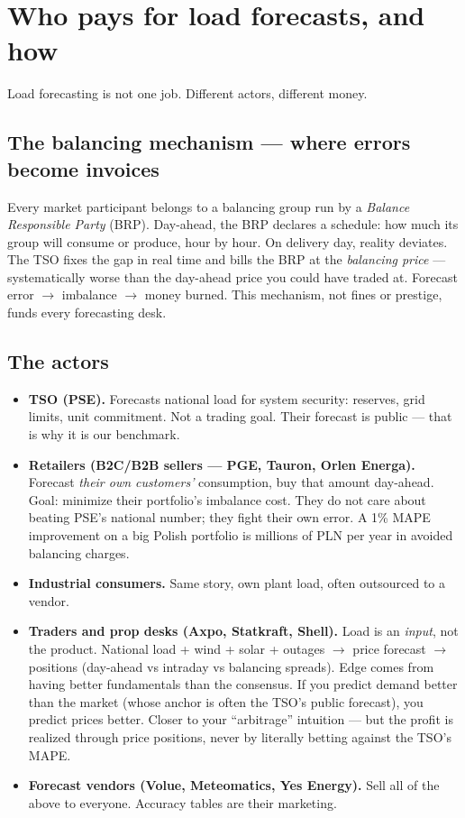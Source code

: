 \section{Who pays for load forecasts, and how}

Load forecasting is not one job. Different actors, different money.

\subsection{The balancing mechanism --- where errors become invoices}

Every market participant belongs to a balancing group run by a
\emph{Balance Responsible Party} (BRP). Day-ahead, the BRP declares a
schedule: how much its group will consume or produce, hour by hour.
On delivery day, reality deviates. The TSO fixes the gap in real time and
bills the BRP at the \emph{balancing price} --- systematically worse than the
day-ahead price you could have traded at. Forecast error $\to$ imbalance
$\to$ money burned. This mechanism, not fines or prestige, funds every
forecasting desk.

\subsection{The actors}

\begin{itemize}
  \item \textbf{TSO (PSE).} Forecasts national load for system security:
        reserves, grid limits, unit commitment. Not a trading goal.
        Their forecast is public --- that is why it is our benchmark.
  \item \textbf{Retailers (B2C/B2B sellers --- PGE, Tauron, Orlen Energa).}
        Forecast \emph{their own customers'} consumption, buy that amount
        day-ahead. Goal: minimize their portfolio's imbalance cost.
        They do not care about beating PSE's national number; they fight
        their own error. A 1\% MAPE improvement on a big Polish portfolio
        is millions of PLN per year in avoided balancing charges.
  \item \textbf{Industrial consumers.} Same story, own plant load, often
        outsourced to a vendor.
  \item \textbf{Traders and prop desks (Axpo, Statkraft, Shell).} Load is an
        \emph{input}, not the product. National load + wind + solar +
        outages $\to$ price forecast $\to$ positions (day-ahead vs intraday
        vs balancing spreads). Edge comes from having better fundamentals
        than the consensus. If you predict demand better than the market
        (whose anchor is often the TSO's public forecast), you predict
        prices better. Closer to your ``arbitrage'' intuition --- but the
        profit is realized through price positions, never by literally
        betting against the TSO's MAPE.
  \item \textbf{Forecast vendors (Volue, Meteomatics, Yes Energy).} Sell all
        of the above to everyone. Accuracy tables are their marketing.
\end{itemize}

